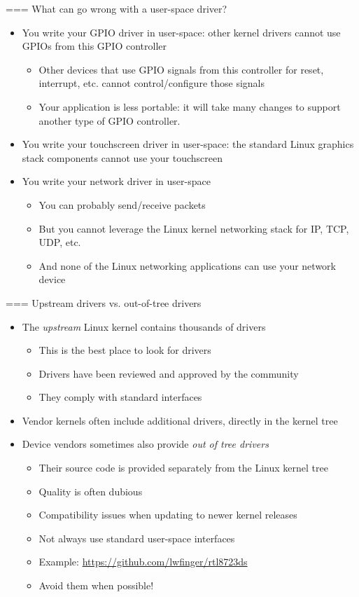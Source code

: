 === {What can go wrong with a user-space driver?}
  \begin{itemize}
  \item You write your GPIO driver in user-space: other kernel drivers
    cannot use GPIOs from this GPIO controller
    \begin{itemize}
    \item Other devices that use GPIO signals from this controller for reset, interrupt, etc. cannot control/configure those signals
    \item Your application is less portable: it will take many changes to support another type of GPIO controller.
    \end{itemize}
  \item You write your touchscreen driver in user-space: the standard
    Linux graphics stack components cannot use your touchscreen
  \item You write your network driver in user-space
    \begin{itemize}
    \item You can probably send/receive packets
    \item But you cannot leverage the Linux kernel networking stack
      for IP, TCP, UDP, etc.
    \item And none of the Linux networking applications can use your
      network device
    \end{itemize}
  \end{itemize}


=== {Upstream drivers vs. out-of-tree drivers}
  \begin{itemize}
  \item The {\em upstream} Linux kernel contains thousands of drivers
    \begin{itemize}
    \item This is the best place to look for drivers
    \item Drivers have been reviewed and approved by the community
    \item They comply with standard interfaces
    \end{itemize}
  \item Vendor kernels often include additional drivers, directly in
    the kernel tree
  \item Device vendors sometimes also provide {\em out of tree
      drivers}
    \begin{itemize}
    \item Their source code is provided separately from the Linux
      kernel tree
    \item Quality is often dubious
    \item Compatibility issues when updating to newer kernel releases
    \item Not always use standard user-space interfaces
    \item Example: \url{https://github.com/lwfinger/rtl8723ds}
    \item Avoid them when possible!
    \end{itemize}
  \end{itemize}


